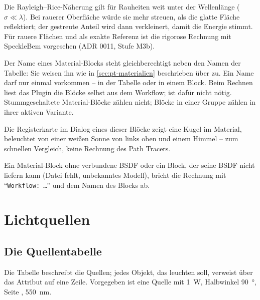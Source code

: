 Die Rayleigh--Rice-Näherung gilt für Rauheiten weit unter der Wellenlänge ($\sigma \ll \lambda$). Bei
rauerer Oberfläche würde sie mehr streuen, als die glatte Fläche reflektiert; der gestreute Anteil
wird dann verkleinert, damit die Energie stimmt. Für rauere Flächen und als exakte Referenz ist die
rigorose Rechnung mit SpeckleBem vorgesehen (ADR 0011, Stufe M3b).

Der Name eines Material-Blocks steht gleichberechtigt neben den Namen der Tabelle: Sie weisen ihn
wie in \autoref{sec:pt-materialien} beschrieben über  zu. Ein Name
darf nur einmal vorkommen -- in der Tabelle oder in einem Block. Beim Rechnen liest das Plugin die
Blöcke selbst aus dem Workflow;  ist dafür nicht nötig. Stummgeschaltete
Material-Blöcke zählen nicht; Blöcke in einer Gruppe zählen in ihrer aktiven Variante.

Die Registerkarte  im Dialog eines dieser Blöcke zeigt eine Kugel im Material,
beleuchtet von einer weißen Sonne von links oben und einem Himmel -- zum schnellen Vergleich, keine
Rechnung des Path Tracers.

\begin{hinweis}
Ein Material-Block ohne verbundene BSDF oder ein Block, der seine BSDF nicht liefern kann (Datei
fehlt, unbekanntes Modell), bricht die Rechnung mit \enquote{\texttt{Workflow: …}} und dem Namen des
Blocks ab.
\end{hinweis}

\section{Lichtquellen}\label{sec:pt-quellen}

\subsection{Die Quellentabelle}

Die Tabelle  beschreibt die Quellen; jedes Objekt, das leuchten soll, verweist über
das Attribut  auf eine Zeile. Vorgegeben ist eine Quelle  mit
\SI{1}{\watt}, Halbwinkel \SI{90}{\degree}, Seite , \SI{550}{\nano\metre}.

